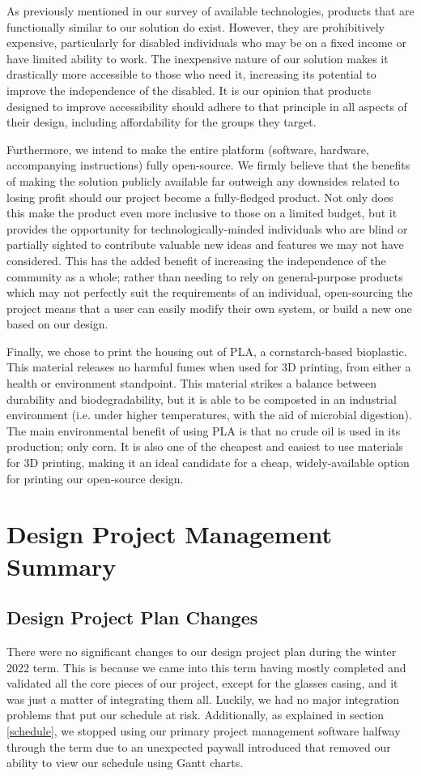 \documentclass[a4paper,11pt]{article}
\begin{document}
As previously mentioned in our survey of available technologies, products that are functionally similar to our solution do exist. However, they are prohibitively expensive, particularly for disabled individuals who may be on a fixed income or have limited ability to work. The inexpensive nature of our solution makes it drastically more accessible to those who need it, increasing its potential to improve the independence of the disabled. It is our opinion that products designed to improve accessibility should adhere to that principle in all aspects of their design, including affordability for the groups they target.

Furthermore, we intend to make the entire platform (software, hardware, accompanying instructions) fully open-source. We firmly believe that the benefits of making the solution publicly available far outweigh any downsides related to losing profit should our project become a fully-fledged product. Not only does this make the product even more inclusive to those on a limited budget, but it provides the opportunity for technologically-minded individuals who are blind or partially sighted to contribute valuable new ideas and features we may not have considered. This has the added benefit of increasing the independence of the community as a whole; rather than needing to rely on general-purpose products which may not perfectly suit the requirements of an individual, open-sourcing the project means that a user can easily modify their own system, or build a new one based on our design.

Finally, we chose to print the housing out of PLA, a cornstarch-based bioplastic. This material releases no harmful fumes when used for 3D printing, from either a health or environment standpoint. This material strikes a balance between durability and biodegradability, but it is able to be composted in an industrial environment (i.e. under higher temperatures, with the aid of microbial digestion). The main environmental benefit of using PLA is that no crude oil is used in its production; only corn. It is also one of the cheapest and easiest to use materials for 3D printing, making it an ideal candidate for a cheap, widely-available option for printing our open-source design.

\section{Design Project Management Summary}
\subsection{Design Project Plan Changes}
There were no significant changes to our design project plan during the winter 2022 term. This is because we came into this term having mostly completed and validated all the core pieces of our project, except for the glasses casing, and it was just a matter of integrating them all. Luckily, we had no major integration problems that put our schedule at risk. Additionally, as explained in section \ref{schedule}, we stopped using our primary project management software halfway through the term due to an unexpected paywall introduced that removed our ability to view our schedule using Gantt charts.
\end{document}
